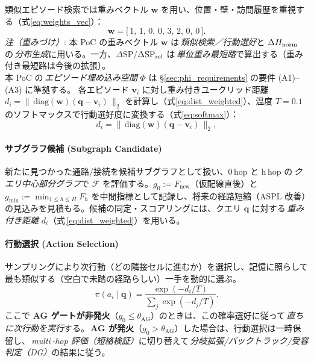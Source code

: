 \documentclass[ja=standard,xelatex]{bxjsarticle}
\newcommand{\F}{\mathcal{F}}
\begin{document}
類似エピソード検索では重みベクトル $\mathbf{w}$ を用い、位置・壁・訪問履歴を重視する（式\ref{eq:weights_vec}）：
\begin{equation}
  \mathbf{w}=\big[\,1,\,1,\,0,\,0,\,3,\,2,\,0,\,0\,\big].\label{eq:weights_vec}
\end{equation}
\noindent\textit{注（重みづけ）}: 本 PoC の重みベクトル $\mathbf{w}$ は\,\emph{類似検索／行動選好}と $\Delta H_{\rm norm}$ の\,\emph{分布生成}に用いる。一方、$\Delta\mathrm{SP}$/$\Delta\mathrm{SP}_{\rm rel}$ は\,\emph{単位重み最短路}で算出する（重み付き最短路は今後の拡張）。\\
\noindent 本 PoC の\,\emph{エピソード埋め込み空間} $\Phi$ は §\ref{sec:phi_requirements} の要件 (A1)–(A3) に準拠する。
各エピソード $\mathbf{v}_i$ に対し重み付きユークリッド距離 $d_i=\lVert\,\mathrm{diag}(\mathbf{w})(\mathbf{q}-\mathbf{v}_i)\,\rVert_2$ を計算し（式\ref{eq:dist_weighted}）、温度 $T=0.1$ のソフトマックスで行動選好度に変換する（式\ref{eq:softmax}）：
\begin{equation}
  d_i=\big\lVert\,\mathrm{diag}(\mathbf{w})(\mathbf{q}-\mathbf{v}_i)\,\big\rVert_2,\label{eq:dist_weighted}
\end{equation}
\paragraph{サブグラフ候補 (Subgraph Candidate)}
新たに見つかった通路/接続を候補サブグラフとして扱い、0\,hop と h\,hop の\,\emph{クエリ中心部分グラフ}で $\F$ を評価する。$g_0{:=}F_{\text{new}}$（仮配線直後）と $g_{\min}{:=}\min_{1\le h\le H}F_h$ を中間指標として記録し、将来の経路短縮（ASPL 改善）の見込みを見積もる。候補の同定・スコアリングには、クエリ $\mathbf{q}$ に対する\,\emph{重み付き距離} $d_i$（式\,\ref{eq:dist_weighted}）を用いる。

\paragraph{行動選択 (Action Selection)}
サンプリングにより次行動（どの隣接セルに進むか）を選択し、記憶に照らして最も類似する（空白で未踏の経路らしい）一手を動的に選ぶ。
\begin{equation}
  \pi(a_i\mid\mathbf{q}) = \frac{\exp(-d_i/T)}{\sum_j \exp(-d_j/T)}.\label{eq:softmax}
\end{equation}
ここで \textbf{AG ゲートが非発火}（$g_0\le\theta_{\mathrm{AG}}$）のときは、この確率選好に従って\,\emph{直ちに次行動を実行}する。\,\textbf{AG が発火}（$g_0>\theta_{\mathrm{AG}}$）した場合は、行動選択は一時保留し、\,\emph{multi\,\mbox{-}hop 評価（短絡検証）}に切り替えて\,\emph{分岐拡張/バックトラック/受容判定（DG）}の結果に従う。
 
\end{document}

